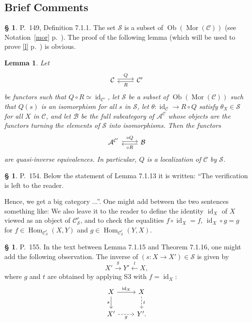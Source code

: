 \documentclass[12pt]{article}
\newtheorem{lem}[thm]{Lemma}
\theoremstyle{remark}
\theoremstyle{definition}
\newtheorem{s}[thm]{\S}
\newcommand{\cc}{\mathcal}
\newcommand{\A}{\mathcal A}
\newcommand{\B}{\mathcal B}
\newcommand{\C}{\mathcal C}
\DeclareMathOperator{\id}{id}
\DeclareMathOperator{\Hom}{Hom}%
\DeclareMathOperator{\Mor}{Mor}
\DeclareMathOperator{\Ob}{Ob}
\begin{document}
\subsection{Brief Comments}
%
\begin{s} 
P.~149, Definition 7.1.1. The set $\cc S$ is a subset of $\Ob(\Mor(\C))$ (see Notation~\ref{mor} p.~\pageref{mor}). The proof of the following lemma (which will be used to prove \eqref{l} p.~\pageref{l}) is obvious. 
%
\begin{lem}\label{711}
%
Let 
$$
\begin{tikzcd}\C\ar[yshift=.5ex]{r}{Q}&\C'\ar[yshift=-.4ex]{l}{R}\end{tikzcd}
$$ 
be functors such that $Q\circ R\simeq\id_{\C'}$, let $\cc S$ be a subset of $\Ob(\Mor(\C))$ such that $Q(s)$ is an isomorphism for all $s$ in $\cc S$, let $\theta:\id_\C\to R\circ Q$ satisfy $\theta_X\in\cc S$ for all $X$ in $\C$, and let $\B$ be the full subcategory of $\A^\C$ whose objects are the functors turning the elements of $\cc S$ into isomorphisms. Then the functors
$$
\begin{tikzcd}\A^{\C'}\ar[yshift=.4ex]{r}{\circ Q}&\B\ar[yshift=-.5ex]{l}{\circ R}\end{tikzcd}
$$
are quasi-inverse equivalences. In particular, $Q$ is a localization of $\C$ by $\cc S$.
%
\end{lem}

\end{s}
%
%
\begin{s} 
P.~154. Below the statement of Lemma 7.1.13 it is written: ``The verification is left to the reader.

Hence, we get a big category ...''. One might add between the two sentences something like: We also leave it to the reader to define the identity $\id_X$ of $X$ viewed as an object of $\C^r_{\mathcal S}$, and to check the equalities $f\circ\id_X=f$, $\id_X\circ g=g$ for $f\in\Hom_{\C^r_{\mathcal S}}(X,Y)$ and $g\in\Hom_{\C^r_{\mathcal S}}(Y,X)$.
\end{s}
%
%
\begin{s} 
P.~155. In the text between Lemma 7.1.15 and Theorem 7.1.16, one might add the following observation. The inverse of $(s:X\to X')\in\mathcal S$ is given by 
$$
X'\overset{g}{\to}Y'\overset{t}{\leftarrow}X,
$$
where $g$ and $t$ are obtained by applying S3 with $f=\id_X$:
$$
\begin{tikzcd}
X\ar{r}{\id_X}\ar{d}[swap]{s}&X\ar[dashed]{d}{t}\\ X'\ar[dashed]{r}[swap]{g}&Y'.
\end{tikzcd}
$$
\end{s}
\end{document}
